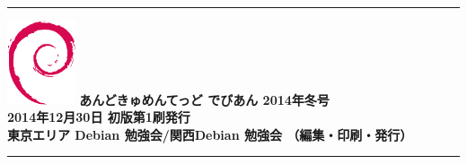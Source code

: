 \documentclass[mingoth,a4paper]{jsarticle}
\begin{document}
\vspace*{13cm}
{\color{dancerlightblue}\rule{\hsize}{1mm}}
\vspace{2mm}
\includegraphics[width=2cm]{image200502/openlogo-nd.eps}
\noindent \Large \bf あんどきゅめんてっど でびあん 2014年冬号\\
\noindent \normalfont 2014年12月30日 \hspace{5mm}  初版第1刷発行\\
\noindent \normalfont 東京エリア Debian 勉強会/関西Debian 勉強会 （編集・印刷・発行）\\
{\color{dancerdarkblue}\rule{\hsize}{1mm}}
\end{document}
